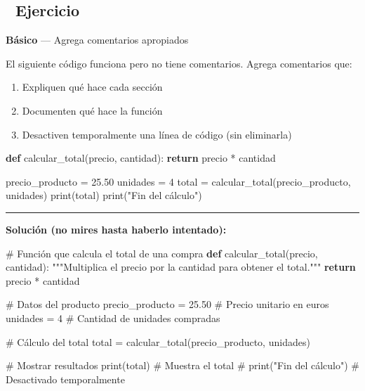 \documentclass[
  doc,
  floatsintext,
  longtable,
  a4paper,
  nolmodern,
  notxfonts,
  notimes,
  12pt,
  colorlinks=true,linkcolor=blue,citecolor=blue,urlcolor=blue]{apa7}
\newenvironment{Shaded}{\begin{snugshade}}{\end{snugshade}}
\newcommand{\BuiltInTok}[1]{\textcolor[rgb]{0.00,0.23,0.31}{#1}}
\newcommand{\CommentTok}[1]{\textcolor[rgb]{0.37,0.37,0.37}{#1}}
\newcommand{\ControlFlowTok}[1]{\textcolor[rgb]{0.00,0.23,0.31}{\textbf{#1}}}
\newcommand{\DecValTok}[1]{\textcolor[rgb]{0.68,0.00,0.00}{#1}}
\newcommand{\FloatTok}[1]{\textcolor[rgb]{0.68,0.00,0.00}{#1}}
\newcommand{\KeywordTok}[1]{\textcolor[rgb]{0.00,0.23,0.31}{\textbf{#1}}}
\newcommand{\NormalTok}[1]{\textcolor[rgb]{0.00,0.23,0.31}{#1}}
\newcommand{\OperatorTok}[1]{\textcolor[rgb]{0.37,0.37,0.37}{#1}}
\newcommand{\StringTok}[1]{\textcolor[rgb]{0.13,0.47,0.30}{#1}}
\providecommand{\tightlist}{%
  \setlength{\itemsep}{0pt}\setlength{\parskip}{0pt}}
\begin{document}
\subsection{📝 Ejercicio}\label{ejercicio}

\textbf{Básico} --- Agrega comentarios apropiados

El siguiente código funciona pero no tiene comentarios. Agrega
comentarios que:

\begin{enumerate}
\def\labelenumi{\arabic{enumi}.}
\tightlist
\item
  Expliquen qué hace cada sección
\item
  Documenten qué hace la función
\item
  Desactiven temporalmente una línea de código (sin eliminarla)
\end{enumerate}

\begin{Shaded}
\begin{Highlighting}[]
\KeywordTok{def}\NormalTok{ calcular\_total(precio, cantidad):}
    \ControlFlowTok{return}\NormalTok{ precio }\OperatorTok{*}\NormalTok{ cantidad}

\NormalTok{precio\_producto }\OperatorTok{=} \FloatTok{25.50}
\NormalTok{unidades }\OperatorTok{=} \DecValTok{4}
\NormalTok{total }\OperatorTok{=}\NormalTok{ calcular\_total(precio\_producto, unidades)}
\BuiltInTok{print}\NormalTok{(total)}
\BuiltInTok{print}\NormalTok{(}\StringTok{"Fin del cálculo"}\NormalTok{)}
\end{Highlighting}
\end{Shaded}

\begin{center}\rule{0.5\linewidth}{0.5pt}\end{center}

\textbf{Solución (no mires hasta haberlo intentado):}

\begin{Shaded}
\begin{Highlighting}[]
\CommentTok{\# Función que calcula el total de una compra}
\KeywordTok{def}\NormalTok{ calcular\_total(precio, cantidad):}
    \CommentTok{"""Multiplica el precio por la cantidad para obtener el total."""}
    \ControlFlowTok{return}\NormalTok{ precio }\OperatorTok{*}\NormalTok{ cantidad}

\CommentTok{\# Datos del producto}
\NormalTok{precio\_producto }\OperatorTok{=} \FloatTok{25.50}  \CommentTok{\# Precio unitario en euros}
\NormalTok{unidades }\OperatorTok{=} \DecValTok{4}             \CommentTok{\# Cantidad de unidades compradas}

\CommentTok{\# Cálculo del total}
\NormalTok{total }\OperatorTok{=}\NormalTok{ calcular\_total(precio\_producto, unidades)}

\CommentTok{\# Mostrar resultados}
\BuiltInTok{print}\NormalTok{(total)            }\CommentTok{\# Muestra el total}
\CommentTok{\# print("Fin del cálculo")  \# Desactivado temporalmente}
\end{Highlighting}
\end{Shaded}
\end{document}
